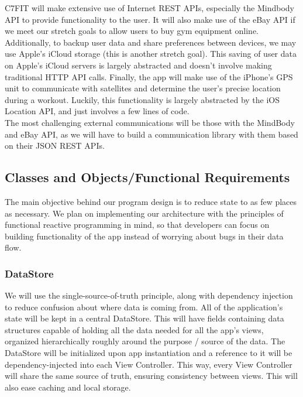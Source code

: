 \documentclass[letterpaper,10pt,titlepage]{article}
\begin{document}
C7FIT will make extensive use of Internet REST APIs, especially the Mindbody API to provide functionality to the user. It will also make use of the eBay API if we meet our stretch goals to allow users to buy gym equipment online. Additionally, to backup user data and share preferences between devices, we may use Apple’s iCloud storage (this is another stretch goal). This saving of user data on Apple’s iCloud servers is largely abstracted and doesn’t involve making traditional HTTP API calls. Finally, the app will make use of the iPhone’s GPS unit to communicate with satellites and determine the user’s precise location during a workout. Luckily, this functionality is largely abstracted by the iOS Location API, and just involves a few lines of code.\\

The most challenging external communications will be those with the MindBody and eBay API, as we will have to build a communication library with them based on their JSON REST APIs.\\

\subsection{Classes and Objects/Functional Requirements}

The main objective behind our program design is to reduce state to as few places as necessary. We plan on implementing our architecture with the principles of functional reactive programming in mind, so that developers can focus on building functionality of the app instead of worrying about bugs in their data flow.\\

\subsubsection{DataStore}

We will use the single-source-of-truth principle, along with dependency injection to reduce confusion about where data is coming from. All of the application’s state will be kept in a central DataStore. This will have fields containing data structures capable of holding all the data needed for all the app’s views, organized hierarchically roughly around the purpose / source of the data. The DataStore will be initialized upon app instantiation and a reference to it will be dependency-injected into each View Controller. This way, every View Controller will share the same source of truth, ensuring consistency between views. This will also ease caching and local storage.\\
\end{document}
